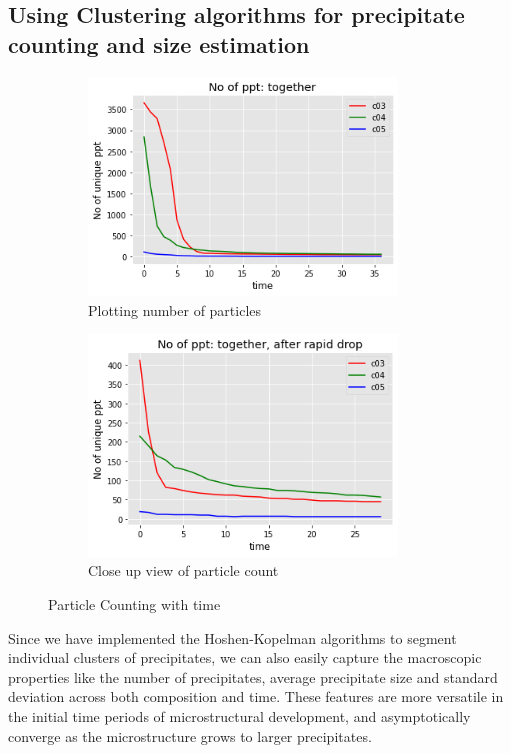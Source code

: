 \documentclass[12pt, a4paper]{report}
\begin{document}
\subsection{Using Clustering algorithms for precipitate counting and size estimation}

\begin{figure}[H]
\centering
\begin{subfigure}{.45\textwidth}
  \centering
  \includegraphics[width=0.9\textwidth]{Pictures/PPTCount/ParticleSizeDist.png}
  \caption{Plotting number of particles}
  \label{img:microstrImg}
\end{subfigure}
\begin{subfigure}{.45\textwidth}
  \centering
  \includegraphics[width=0.9\textwidth]{Pictures/PPTCount/ParticleSizeDistAfterDrop.png}
  \caption{Close up view of particle count}
  \label{img:microstrImg}
\end{subfigure}
\caption{Particle Counting with time}
\label{fig:test22}
\end{figure}
Since we have implemented the Hoshen-Kopelman algorithms to segment individual clusters of precipitates, we can also easily capture the macroscopic properties like the number of precipitates, average precipitate size and standard deviation across both composition and time. These features are more versatile in the initial time periods of microstructural development, and asymptotically converge as the microstructure grows to larger precipitates. 
\end{document}
